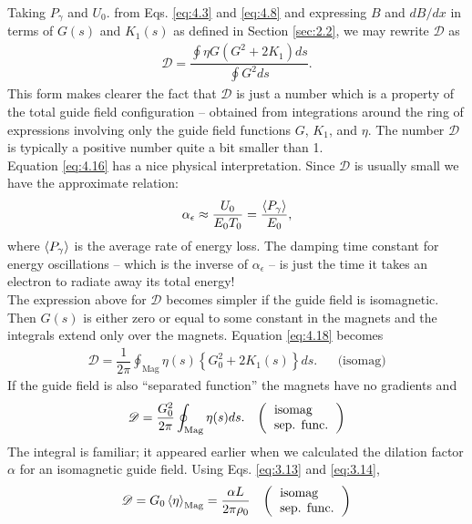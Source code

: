 Taking $P_\gamma$ and $U_0$. from Eqs. \eqref{eq:4.3} and \eqref{eq:4.8} and expressing
 $B$ and $dB/dx$ in terms of $G(s)$ and $K_1(s)$ as defined in Section \ref{sec:2.2}, we may rewrite $\mathscr{D}$ as
\begin{align} \label{eq:4.18}
	\mathscr{D} = \dfrac{\oint \eta G (G^2 + 2K_1)ds}{\oint G^2 ds}.
\end{align}
This form makes clearer the fact that $\mathscr{D}$ is just a number which is a property of
the total guide field configuration -- obtained from integrations around the ring of expressions
 involving only the guide field functions $G$, $K_1$, and $\eta$. The number $\mathscr{D}$ is typically a positive number quite a bit smaller than 1.\\
Equation \eqref{eq:4.16} has a nice physical interpretation. Since $\mathscr{D}$ is usually small
we have the approximate relation:
\begin{align}
	\alpha_\epsilon \approx \dfrac{U_0}{E_0 T_0} = \dfrac{\left< P_\gamma \right>}{E_0},
\end{align}
where $\left< P_\gamma \right>$ is the average rate of energy loss. The damping time constant for energy oscillations -- which is the inverse of $\alpha_\epsilon$ -- is just the time it takes an electron to radiate away its total energy!\\
The expression above for $\mathscr{D}$ becomes simpler if the guide field is isomagnetic. Then $G(s)$ is either zero or equal to some constant in the magnets and the integrals extend only over the magnets. Equation \eqref{eq:4.18} becomes
\begin{align} \label{eq:4.20}
	\mathscr{D} = \dfrac{1}{2\pi}\oint_{\text{Mag}}\eta(s)\left\lbrace G_0^2 + 2K_1(s) \right\rbrace ds. && \text{(isomag)}
\end{align}
If the guide field is also ``separated function'' the magnets have no gradients and
\begin{align}\label{eq:4.17}
	\mathscr{D} = \dfrac{G_0^2}{2\pi}\oint_{\text{Mag}}\eta(s) ds. && \left(\begin{tabular}{l}
\text{isomag} \\
\text{sep. func.}
\end{tabular}\right)
\end{align}
The integral is familiar; it appeared earlier when we calculated the dilation factor $\alpha$ for an isomagnetic guide field. Using Eqs. \eqref{eq:3.13} and \eqref{eq:3.14},
\begin{align}
	\mathscr{D} = G_0 \mean{\eta}_\text{Mag} = \dfrac{\alpha L}{2 \pi \rho_0} && \left(\begin{tabular}{l}
\text{isomag} \\
\text{sep. func.}
\end{tabular}\right)
\end{align}
